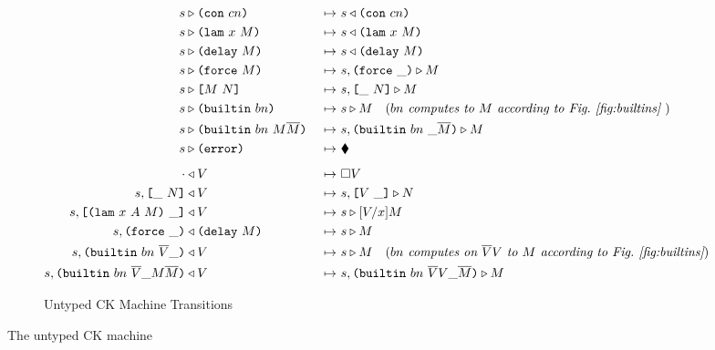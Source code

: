 \documentclass[../plutus-core-specification.tex]{subfiles}
\begin{document}
\begin{figure}[H]
\begin{subfigure}[c]{\linewidth}
\hspace{-1cm}\begin{minipage}{\linewidth}
\begin{alignat*}{2}
  s & \compute \con{cn}                          &~\mapsto~& s \return \con{cn}\\
  s & \compute \lamU{x}{M}                       &~\mapsto~& s \return \lamU{x}{M}\\
  s & \compute \delay{M}                         &~\mapsto~& s \return \delay{M}\\
  s & \compute \force{M}                         &~\mapsto~& s,\inForceFrame{} \compute M \\
  s & \compute \appU{M}{N}                       &~\mapsto~& s,\inAppLeftFrame{N} \compute M\\
  s & \compute \builtinU{bn}{\!\!}               &~\mapsto~& s \compute M
                                                 \quad (\textit{$bn$ computes to $M$ according to Fig.~\ref{fig:builtins} }) \\
  s & \compute \builtinU{bn}{M \repetition{M}}   &~\mapsto~& s,\inBuiltinU{bn}{}{\_}{\repetition{M}} \compute M\\
  s & \compute \errorU                           &~\mapsto~& \ckerror{}\\
  \\[-10pt] %
  \cdot & \return V                              &~\mapsto~& \square V\\
  s,\inAppLeftFrame{N} & \return V               &~\mapsto~& s,\inAppRightFrame{V} \compute N\\
  s,\inAppRightFrame{\lam{x}{A}{M}} & \return V  &~\mapsto~& s \compute \subst{V}{x}{M}\\
  s,\inForceFrame{} & \return \delay{M}          &~\mapsto~& s \compute M\\
  s,\inBuiltinU{bn}{\repetition{V}}{\_}{} & \return V
                                                 &~\mapsto~&  s \compute M
                                                 \quad (\textit{$bn$ computes on $\repetition{V}V$ to $M$ according to Fig.~\ref{fig:builtins}})\\
  s,\inBuiltinU{bn}{\repetition{V}}{\_}{M \repetition{M}} & \return V
                                                 &~\mapsto~& s,\inBuiltinU{bn}{\repetition{V} V}{\_}{\repetition{M}} \compute M\\
    \end{alignat*}
\end{minipage}
    \caption{Untyped CK Machine Transitions}
    \label{fig:untyped-ck-transitions}
\end{subfigure}
\caption{The untyped CK machine}
\label{fig:untyped-ck-machine}
\end{figure}
\end{document}
